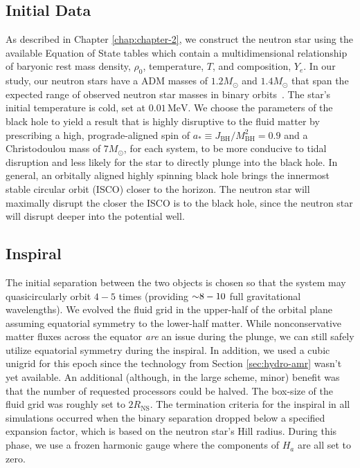 \subsection{Initial Data} As described in Chapter \ref{chap:chapter-2}, we construct the neutron star using the available Equation of State tables which contain a multidimensional relationship of baryonic rest mass density, $\rho_0$, temperature, $T$, and composition, $Y_e$.  In our study, our neutron stars have a ADM masses of $1.2 M_\odot$ and $1.4 M_\odot$ that span the expected range of observed neutron star masses in binary orbits~\cite{Ozel2012}.  The star's initial temperature is cold, set at $0.01\,\textrm{MeV}$.  We choose the parameters of the black hole to yield a result that is highly disruptive to the fluid matter by prescribing a high, prograde-aligned spin of $a_* \equiv J_\textrm{BH}/M_\textrm{BH}^2 = 0.9$ and a Christodoulou mass of $7 M_\odot$, for each system, to be more conducive to tidal disruption and less likely for the star to directly plunge into the black hole.
In general, an orbitally aligned highly spinning black hole brings the innermost stable circular orbit (ISCO) closer to the horizon.
The neutron star will maximally disrupt the closer the ISCO is to the black hole, since the  neutron star will disrupt deeper into the potential well.

\subsection{Inspiral}
The initial separation between the two objects is chosen so that the system may quasicircularly orbit $4-5$ times (providing $\mathord{\sim} 8-10$ full gravitational wavelengths).  
We evolved the fluid grid in the upper-half of the orbital plane assuming equatorial symmetry to the lower-half matter.  While nonconservative matter fluxes across the equator \textit{are} an issue during the plunge, we can still safely utilize equatorial symmetry during the inspiral.  
In addition, we used a cubic unigrid for this epoch since the technology from Section \ref{sec:hydro-amr} wasn't yet available.
An additional (although, in the large scheme, minor) benefit was that the number of requested processors could be halved.  
The box-size of the fluid grid was roughly set to $2 R_\textrm{NS}$.  
The termination criteria for the inspiral in all simulations occurred when the binary separation dropped below a specified expansion factor, which is based on the neutron star's Hill radius.
During this phase, we use a frozen harmonic gauge where the components of $H_a$ are all set to zero.  
	
